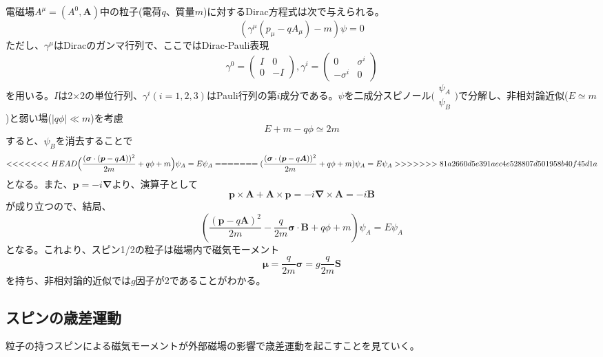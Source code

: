 電磁場$A^{\mu}=(A^0,\bm{A})$中の粒子(電荷$q$、質量$m$)に対するDirac方程式は次で与えられる。
\begin{equation}
(\gamma^{\mu}(p_{\mu}-qA_{\mu})-m)\psi=0
\end{equation}
ただし、$\gamma^{\mu}$はDiracのガンマ行列で、ここではDirac-Pauli表現
\begin{equation}
\gamma^0=\begin{pmatrix} I & 0 \\ 0 & -I \end{pmatrix},
\gamma^i=\begin{pmatrix} 0 & \sigma^i \\ -\sigma^i & 0 \end{pmatrix}
\end{equation}
を用いる。$I$は2×2の単位行列、$\gamma^i(i=1,2,3)$はPauli行列の第$i$成分である。$\psi$を二成分スピノール$\bigl( \begin{smallmatrix} \psi_A \\ \psi_B \end{smallmatrix} \bigr)$で分解し、非相対論近似($E\simeq m$)と弱い場($|q\phi|\ll m$)を考慮
\begin{equation}
E+m-q\phi\simeq2m
\end{equation}
すると、$\psi_B$を消去することで
\begin{equation}
<<<<<<< HEAD
\Bigl(\frac{(\bm{\sigma}\cdot(\bm{p}-q\bm{A}))^2}{2m}+q\phi+m\Bigr)\psi_A=E\psi_A
=======
(\frac{(\bm{\sigma}\cdot(\bm{p}-q\bm{A}))^2}{2m}+q\phi+m)\psi_A=E\psi_A
>>>>>>> 81a2660d5e391aec4e528807d501958b40f45d1a
\end{equation}
となる。また、$\bm{p}=-i\bm{\nabla}$より、演算子として
\begin{equation}
\bm{p}\times\bm{A}+\bm{A}\times\bm{p}=-i\bm{\nabla}\times\bm{A}=-i\bm{B}
\end{equation}
が成り立つので、結局、
\begin{equation}
(\frac{(\bm{p}-q\bm{A})^2}{2m}-\frac{q}{2m}\bm{\sigma}\cdot\bm{B}+q\phi+m)\psi_A=E\psi_A
\end{equation}
となる。これより、スピン1/2の粒子は磁場内で磁気モーメント
\begin{equation}
\bm{\mu}=\frac{q}{2m}\bm{\sigma}=g\frac{q}{2m}\bm{S}
\end{equation}
を持ち、非相対論的近似では$g$因子が2であることがわかる。
\subsection{スピンの歳差運動}
粒子の持つスピンによる磁気モーメントが外部磁場の影響で歳差運動を起こすことを見ていく。

